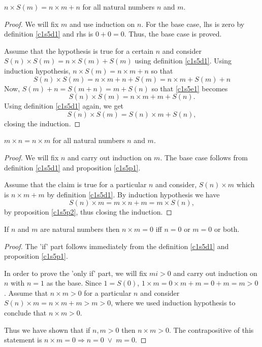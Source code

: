 \begin{prop}\label{c1s5p2}
$n \times S(m) = n \times m + n$ for all natural numbers $n$ and $m$.
\end{prop}
\begin{proof}
We will fix $m$ and use induction on $n$. For the base case, lhs is zero by
definition \ref{c1s5d1} and rhs is $0 + 0 = 0$. Thus, the base case is 
proved.

Assume that the hypothesis is true for a certain $n$ and consider $S(n) 
\times S(m) = n \times S(m) + S(m)$ using definition \ref{c1s5d1}. Using 
induction hypothesis, $n \times S(m) = n \times m + n$ so that
\begin{equation}\label{c1s5e1}
S(n) \times S(m) = n \times m + n + S(m) = n \times m + S(m) + n
\end{equation}
Now, $S(m) + n = S(m + n) = m + S(n)$ so that \eqref{c1s5e1} becomes
\begin{equation}\label{c1s5e2}
S(n) \times S(m) = n \times m + m + S(n).
\end{equation}
Using definition \eqref{c1s5d1} again, we get
\begin{equation}\label{c1s5e3}
S(n) \times S(m) = S(n) \times m + S(n),
\end{equation}
closing the induction.
\end{proof}

\begin{prop}\label{c1s5p3}
$m \times n = n \times m$ for all natural numbers $n$ and $m$.
\end{prop}
\begin{proof}
We will fix $n$ and carry out induction on $m$. The base case follows from 
definition \ref{c1s5d1} and proposition \ref{c1s5p1}.

Assume that the claim is true for a particular $n$ and consider, $S(n) 
\times m$ which is $n \times m + m$ by definition \ref{c1s5d1}. By 
induction hypothesis we have
\begin{equation}\label{c1s5e4}
S(n) \times m = m \times n + m = m \times S(n),
\end{equation}
by proposition \ref{c1s5p2}, thus closing the induction.
\end{proof}

\begin{prop}\label{c1s5p4}
If $n$ and $m$ are natural numbers then $n \times m = 0$ iff $n = 0$ or
$m = 0$ or both.
\end{prop}
\begin{proof}
The 'if' part follows immediately from the definition \ref{c1s5d1} and
proposition \ref{c1s5p1}.

In order to prove the 'only if' part, we will fix $mi > 0$ and carry out 
induction on $n$ with $n = 1$ as the base. Since $1 = S(0)$, $1 \times m
= 0 \times m + m = 0 + m = m > 0$. Assume that $n \times m > 0$ for a 
particular $n$ and consider $S(n) \times m = n \times m + m > m > 0$, where
we used induction hypothesis to conclude that $n \times m > 0$. 

Thus we have shown that if $n, m > 0$ then $n \times m > 0$. The 
contrapositive of this statement is $n \times m = 0 \Rightarrow n = 0
\;\lor\; m = 0$.
\end{proof}

